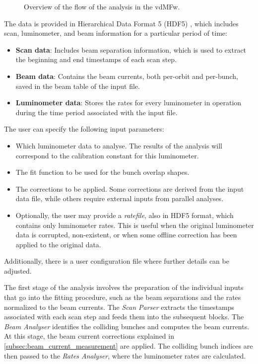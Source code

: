 \begin{figure}[!htb]
	\centering
	\caption{Overview of the flow of the analysis in the vdMFw.}
	\label{fig:vdm_fw_flowchart}
\end{figure}

The data is provided in Hierarchical Data Format 5 (HDF5) \cite{koranne2011hierarchical}, which includes scan, luminometer, and beam information for a particular period of time:
\begin{itemize}
	\item \textbf{Scan data}: Includes beam separation information, which is used to extract the beginning and end timestamps of each scan step.
	\item \textbf{Beam data}: Contains the beam currents, both per-orbit and per-bunch, saved in the beam table of the input file.
	\item \textbf{Luminometer data}: Stores the rates for every luminometer in operation during the time period associated with the input file.
\end{itemize}
The user can specify the following input parameters:
\begin{itemize}
	\item Which luminometer data to analyse. The results of the analysis will correspond to the calibration constant for this luminometer.
	\item The fit function to be used for the bunch overlap shapes.
	\item The corrections to be applied. Some corrections are derived from the input data file, while others require external inputs from parallel analyses.
	\item Optionally, the user may provide a \textit{ratefile}, also in HDF5 format, which contains only luminometer rates. This is useful when the original luminometer data is corrupted, non-existent, or when some offline correction has been applied to the original data.
\end{itemize}
Additionally, there is a user configuration file where further details can be adjusted.

The first stage of the analysis involves the preparation of the individual inputs that go into the fitting procedure, such as the beam separations and the rates normalized to the beam currents. The \textit{Scan Parser} extracts the timestamps associated with each scan step and feeds them into the subsequent blocks. The \textit{Beam Analyser} identifies the colliding bunches and computes the beam currents. At this stage, the beam current corrections explained in \autoref{subsec:beam_current_measurement} are applied. The colliding bunch indices are then passed to the \textit{Rates Analyser}, where the luminometer rates are calculated.

